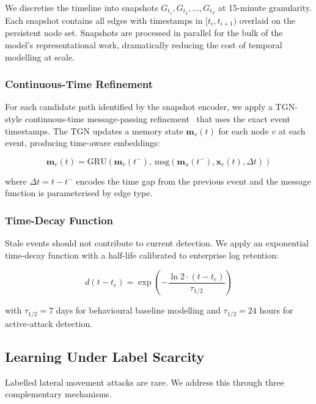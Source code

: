 \documentclass[sigconf,nonacm]{acmart}
\begin{document}
We discretise the timeline into snapshots
$G_{t_1}, G_{t_2}, \ldots, G_{t_T}$ at 15-minute granularity. Each snapshot
contains all edges with timestamps in $[t_i, t_{i+1})$ overlaid on the
persistent node set. Snapshots are processed in parallel for the bulk of
the model's representational work, dramatically reducing the cost of
temporal modelling at scale.

\subsubsection{Continuous-Time Refinement}

For each candidate path identified by the snapshot encoder, we apply a
TGN-style continuous-time message-passing
refinement~\cite{rossi2020tgn} that uses the exact event timestamps. The
TGN updates a memory state $\mathbf{m}_v(t)$ for each node $v$ at each
event, producing time-aware embeddings:

\begin{equation}
  \mathbf{m}_v(t) = \mathrm{GRU}\!\left(\mathbf{m}_v(t^-),\ 
    \mathrm{msg}(\mathbf{m}_u(t^-), \mathbf{x}_e(t), \Delta t)\right)
\end{equation}

where $\Delta t = t - t^-$ encodes the time gap from the previous event and
the message function is parameterised by edge type.

\subsubsection{Time-Decay Function}

Stale events should not contribute to current detection. We apply an
exponential time-decay function with a half-life calibrated to enterprise
log retention:

\begin{equation}
  d(t-t_e) = \exp\!\left(-\frac{\ln 2 \cdot (t - t_e)}{\tau_{1/2}}\right)
\end{equation}

with $\tau_{1/2} = 7$ days for behavioural baseline modelling and
$\tau_{1/2} = 24$ hours for active-attack detection.

\subsection{Learning Under Label Scarcity}

Labelled lateral movement attacks are rare. We address this through three
complementary mechanisms.
\end{document}
